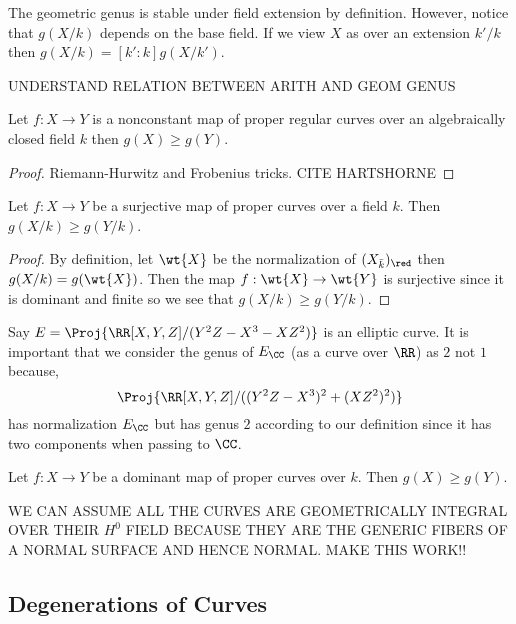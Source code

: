 \documentclass[12pt]{article}
\begin{document}
\begin{rmk}
The geometric genus is stable under field extension by definition. 
However, notice that $g(X/k)$ depends on the base field. If we view $X$ as over an extension $k' / k$ then $g(X/k) = [k' : k] g(X / k')$.  
\end{rmk}


UNDERSTAND RELATION BETWEEN ARITH AND GEOM GENUS

\begin{lemma}
Let $f : X \to Y$ is a nonconstant map of proper regular curves over an algebraically closed field $k$ then $g(X) \ge g(Y)$.
\end{lemma}

\begin{proof}
Riemann-Hurwitz and Frobenius tricks. CITE HARTSHORNE
\end{proof}

\begin{prop}
Let $f : X \to Y$ be a surjective map of proper curves over a field $k$. Then $g(X/k) \ge g(Y/k)$.
\end{prop}

\begin{proof}
By definition, let $\wt{X}$ be the normalization of $(X_{\bar{k}})_{\red}$ then $g(X/k) = g(\wt{X})$. Then the map $f : \wt{X} \to \wt{Y}$ is surjective since it is dominant and finite so we see that $g(X/k) \ge g(Y/k)$.
\end{proof}

\begin{example}
Say $E = \Proj{\RR[X,Y,Z]/(Y^2 Z - X^3 - X Z^2)}$ is an elliptic curve. It is important that we consider the genus of $E_{\CC}$ (as a curve over $\RR$) as $2$ not $1$ because,
\[ \Proj{\RR[X,Y,Z]/((Y^2 Z - X^3)^2 + (X Z^2)^2)} \]
has normalization $E_{\CC}$ but has genus $2$ according to our definition since it has two components when passing to $\CC$.
\end{example}

\begin{prop}
Let $f : X \to Y$ be a dominant map of proper curves over $k$. Then $g(X) \ge g(Y)$.
\end{prop}




WE CAN ASSUME ALL THE CURVES ARE GEOMETRICALLY INTEGRAL OVER THEIR $H^0$ FIELD BECAUSE THEY ARE THE GENERIC FIBERS OF A NORMAL SURFACE AND HENCE NORMAL. MAKE THIS WORK!!



\subsection{Degenerations of Curves}
\end{document}
